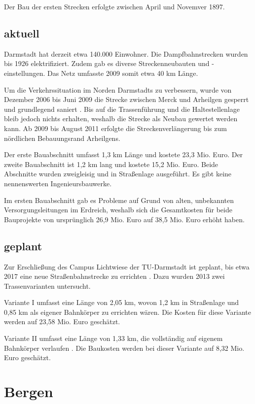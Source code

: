 Der Bau der ersten Strecken erfolgte zwischen April und Novemver 1897.

\subsection*{aktuell}

Darmstadt hat derzeit etwa 140.000 Einwohner. Die Dampfbahnstrecken wurden bis
1926 elektrifiziert. Zudem gab es diverse Streckenneubauten und
-einstellungen. Das Netz umfasste 2009 somit etwa 40 km Länge.

Um die Verkehrssituation im Norden Darmstadts zu verbessern, wurde von Dezember
2006 bis Juni 2009 die Strecke zwischen Merck und Arheilgen gesperrt und
grundlegend saniert \cite{eoDaAr1}.  Bis auf die Trassenführung und die
Haltestellenlage bleib jedoch nichts erhalten, weshalb die Strecke als Neubau
gewertet werden kann. Ab 2009 bis August 2011 erfolgte die Streckenverlängerung
bis zum nördlichen Bebauungsrand Arheilgens. \cite{eoDaAr2} \cite{eoDaAr3}

Der erste Bauabschnitt umfasst 1,3 km Länge und kostete 23,3 Mio. Euro. Der
zweite Bauabschnitt ist 1,2 km lang und kostete 15,2 Mio. Euro. Beide Abschnitte
wurden zweigleisig und in Straßenlage ausgeführt. Es gibt keine nennenswerten
Ingenieursbauwerke.

Im ersten Bauabschnitt gab es Probleme auf Grund von alten, unbekannten
Versorgungsleitungen im Erdreich, weshalb sich die Gesamtkosten für beide
Bauprojekte von ursprünglich 26,9 Mio. Euro auf 38,5 Mio. Euro erhöht haben.

\subsection*{geplant}

Zur Erschließung des Campus Lichtwiese der TU-Darmstadt ist geplant, bis etwa
2017 eine neue Straßenbahnstrecke zu errichten \cite{mrDaLw}. Dazu wurden 2013
zwei Trassenvarianten untersucht.

Variante I umfasst eine Länge von 2,05 km, wovon 1,2 km in Straßenlage und 0,85
km als eigener Bahnkörper zu errichten wären. Die Kosten für diese Variante
werden auf 23,58 Mio.  Euro geschätzt.

Variante II umfasst eine Länge von 1,33 km, die vollständig auf eigenem
Bahnkörper verlaufen \cite{eoDaLw}.  Die Baukosten werden bei dieser Variante
auf 8,32 Mio. Euro geschätzt.

\section{Bergen}

